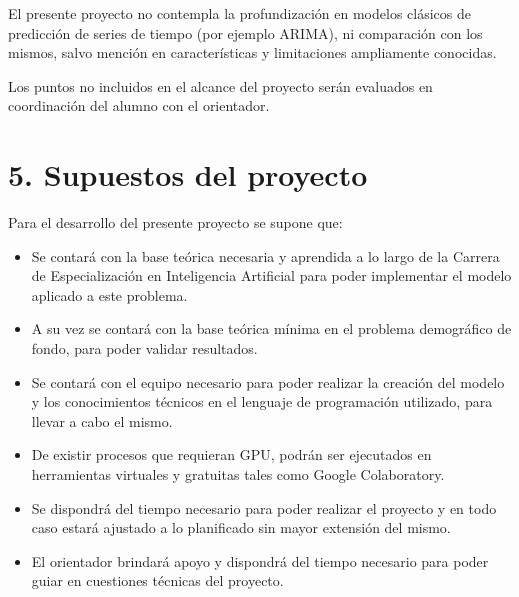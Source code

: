 \documentclass[
11pt, %
]{charter}
\begin{document}
El presente proyecto no contempla la profundización en modelos clásicos de predicción de series de tiempo (por ejemplo ARIMA), ni comparación con los mismos, salvo mención en características y limitaciones ampliamente conocidas.

Los puntos no incluidos en el alcance del proyecto serán evaluados en coordinación del alumno con el orientador.

\pagebreak

\section{5. Supuestos del proyecto}
\label{sec:supuestos}


%

Para el desarrollo del presente proyecto se supone que:

\begin{itemize}
	\item Se contará con la base teórica necesaria y aprendida a lo largo de la Carrera de Especialización en Inteligencia Artificial para poder implementar el modelo aplicado a este problema.
	\item A su vez se contará con la base teórica mínima en el problema demográfico de fondo, para poder validar resultados.
	\item Se contará con el equipo necesario para poder realizar la creación del modelo y los conocimientos técnicos en el lenguaje de programación utilizado, para llevar a cabo el mismo.
	\item De existir procesos que requieran GPU, podrán ser ejecutados en herramientas virtuales y
	gratuitas tales como Google Colaboratory.
	\item Se dispondrá del tiempo necesario para poder realizar el proyecto y en todo caso estará ajustado a lo planificado sin mayor extensión del mismo.
	\item El orientador brindará apoyo y dispondrá del tiempo necesario para poder guiar en cuestiones técnicas del proyecto.
\end{itemize}
\end{document}
